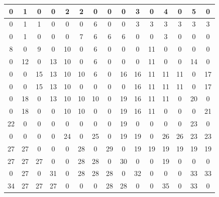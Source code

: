 \begin{figure}[H]
	\centering
	\scriptsize %
	\setlength{\tabcolsep}{3.5pt} %
	\renewcommand{\arraystretch}{1.3} %
	\begin{minipage}{0.4\textwidth}
		\centering
		\begin{center}
			\begin{tabular}{|*{15}{c|}}
				\hline
				0 & 1 & 0 & 0 & 2 & 2 & 0 & 0 & 0 & 3 & 0 & 4 & 0 & 5 & 0 \\
				\hline
				0 & 1 & 1 & 0 & 0 & 0 & 6 & 0 & 0 & 3 & 3 & 3 & 3 & 3 & 3 \\
				\hline
				0 & 1 & 0 & 0 & 0 & 7 & 6 & 6 & 6 & 0 & 0 & 3 & 0 & 0 & 0 \\
				\hline
				8 & 0 & 9 & 0 & 10 & 0 & 6 & 0 & 0 & 0 & 11 & 0 & 0 & 0 & 0 \\
				\hline
				0 & 12 & 0 & 13 & 10 & 0 & 6 & 0 & 0 & 0 & 11 & 0 & 0 & 14 & 0 \\
				\hline
				0 & 0 & 15 & 13 & 10 & 10 & 6 & 0 & 16 & 16 & 11 & 11 & 11 & 0 & 17 \\
				\hline
				0 & 0 & 15 & 13 & 10 & 0 & 0 & 0 & 0 & 16 & 11 & 11 & 11 & 0 & 17 \\
				\hline
				0 & 18 & 0 & 13 & 10 & 10 & 10 & 0 & 19 & 16 & 11 & 11 & 0 & 20 & 0 \\
				\hline
				0 & 18 & 0 & 0 & 10 & 10 & 0 & 0 & 19 & 16 & 11 & 0 & 0 & 0 & 21 \\
				\hline
				22 & 0 & 0 & 0 & 0 & 0 & 0 & 0 & 19 & 0 & 0 & 0 & 0 & 23 & 0 \\
				\hline
				0 & 0 & 0 & 0 & 24 & 0 & 25 & 0 & 19 & 19 & 0 & 26 & 26 & 23 & 23 \\
				\hline
				27 & 27 & 0 & 0 & 0 & 28 & 0 & 29 & 0 & 19 & 19 & 19 & 19 & 19 & 19 \\
				\hline
				27 & 27 & 27 & 0 & 0 & 28 & 28 & 0 & 30 & 0 & 0 & 19 & 0 & 0 & 0 \\
				\hline
				0 & 27 & 0 & 31 & 0 & 28 & 28 & 28 & 0 & 32 & 0 & 0 & 0 & 33 & 33 \\
				\hline
				34 & 27 & 27 & 27 & 0 & 0 & 0 & 28 & 28 & 0 & 0 & 35 & 0 & 33 & 0 \\
				\hline
			\end{tabular}
		\end{center}
	\end{minipage}
	\hfill
	\begin{minipage}{0.45\textwidth}
		\centering

\end{minipage}
\end{figure}
